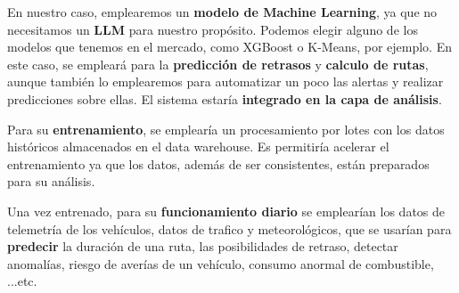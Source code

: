 En nuestro caso, emplearemos un \textbf{modelo de Machine Learning}, ya que no necesitamos un \textbf{LLM} para nuestro propósito. Podemos elegir alguno de los modelos que tenemos en el mercado, como XGBoost o K-Means, por ejemplo. En este caso, se empleará para la \textbf{predicción de retrasos} y \textbf{calculo de rutas}, aunque también lo emplearemos para automatizar un poco las alertas y realizar predicciones sobre ellas. El sistema estaría \textbf{integrado en la capa de análisis}.

Para su \textbf{entrenamiento}, se emplearía un procesamiento por lotes con los datos históricos almacenados en el data warehouse. Es permitiría acelerar el entrenamiento ya que los datos, además de ser consistentes, están preparados para su análisis. 

Una vez entrenado, para su \textbf{funcionamiento diario} se emplearían los datos de telemetría de los vehículos, datos de trafico y meteorológicos, que se usarían para \textbf{predecir} la duración de una ruta, las posibilidades de retraso, detectar anomalías, riesgo de averías de un vehículo, consumo anormal de combustible, ...etc.






  